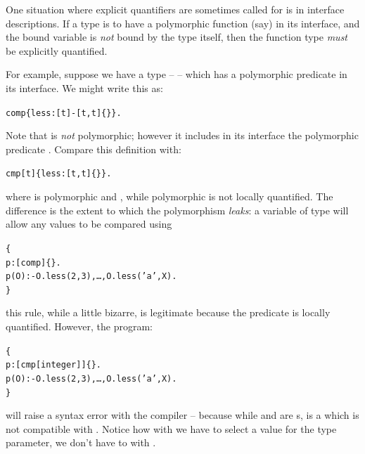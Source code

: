One situation where explicit quantifiers are sometimes called for is in interface descriptions. If a type is to have a polymorphic function (say) in its interface, and the bound variable is \emph{not} bound by the type itself, then the function type \emph{must} be explicitly quantified.

For example, suppose we have a type --  -- which has a polymorphic  predicate in its interface. We might write this as:
\begin{alltt}
comp \typearrow \{ less:[t]-[t,t]\{\} \}.
\end{alltt}
Note that  is \emph{not} polymorphic; however it includes in its interface the polymorphic predicate . Compare this definition with:
\begin{alltt}
cmp[t] \typearrow \{ less:[t,t]\{\} \}.
\end{alltt}
where  is polymorphic and , while polymorphic is not locally quantified. The difference is the extent to which the polymorphism \emph{leaks}: a variable of type  will allow any values to be compared using 
\begin{alltt}
\{
  p:[comp]\{\}.
  p(O) :- O.less(2,3), \ldots, O.less('a',X).
\}
\end{alltt}
this rule, while a little bizarre, is legitimate because the  predicate is locally  quantified. However, the program:
\begin{alltt}
\{
  p:[cmp[integer]]\{\}.
  p(O) :- O.less(2,3), \ldots, O.less('a',X).
\}
\end{alltt}
will raise a syntax error with the compiler -- because while  and  are s,  is a  which is not compatible with . Notice how with  we have to select a value for the type parameter, we don't have to with .

